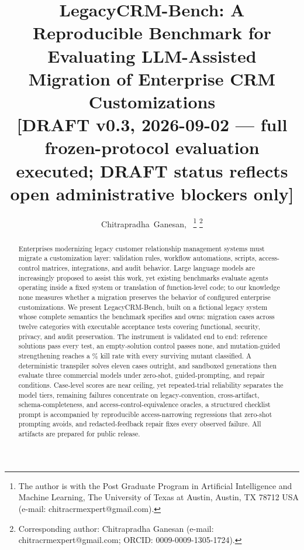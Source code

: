 \documentclass[journal]{IEEEtran}
\begin{document}
\title{LegacyCRM-Bench: A Reproducible Benchmark for Evaluating LLM-Assisted Migration of
Enterprise CRM Customizations\\
{\normalsize [DRAFT v0.3, 2026-09-02 --- full frozen-protocol evaluation executed;
DRAFT status reflects open administrative blockers only]}}

\author{Chitrapradha~Ganesan,~%
\thanks{The author is with the Post Graduate Program in Artificial Intelligence and Machine
Learning, The University of Texas at Austin, Austin, TX 78712 USA (e-mail:
chitracrmexpert@gmail.com).}%
\thanks{Corresponding author: Chitrapradha Ganesan (e-mail: chitracrmexpert@gmail.com;
ORCID: 0009-0009-1305-1724).}}

\maketitle

\begin{abstract}
Enterprises modernizing legacy customer relationship management systems must migrate a
customization layer: validation rules, workflow automations, scripts, access-control
matrices, integrations, and audit behavior. Large language models are increasingly proposed
to assist this work, yet existing benchmarks evaluate agents operating inside a fixed system
or translation of function-level code; to our knowledge none measures whether a migration
preserves the behavior of configured enterprise customizations. We present LegacyCRM-Bench,
built on a fictional legacy system whose complete semantics the benchmark specifies and
owns: \NumCases{} migration cases across twelve categories with \NumTests{} executable
acceptance tests covering functional, security, privacy, and audit preservation. The
instrument is validated end to end: reference solutions pass every test, an empty-solution
control passes none, and mutation-guided strengthening reaches a \KillRate\% kill rate with
every surviving mutant classified. A deterministic transpiler solves eleven cases outright,
and \PTwoGens{} sandboxed generations then evaluate three commercial models under
zero-shot, guided-prompting, and repair conditions. Case-level scores are near ceiling, yet repeated-trial
reliability separates the model tiers, remaining failures concentrate on
legacy-convention, cross-artifact, schema-completeness, and access-control-equivalence
oracles, a structured
checklist prompt is accompanied by reproducible access-narrowing regressions that zero-shot
prompting avoids, and redacted-feedback repair fixes every observed failure. All artifacts are prepared for public release.
\end{abstract}
\end{document}

